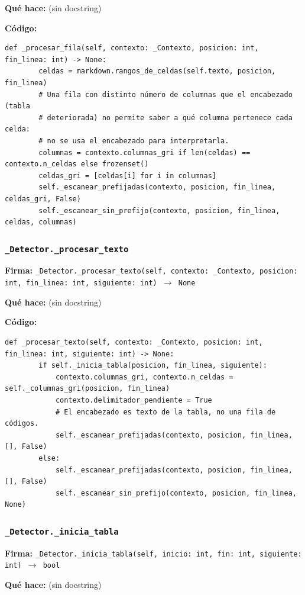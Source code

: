 \documentclass[11pt,a4paper]{article}
\begin{document}
\textbf{Qué hace:} (sin docstring)

\textbf{Código:}
\begin{lstlisting}
def _procesar_fila(self, contexto: _Contexto, posicion: int, fin_linea: int) -> None:
        celdas = markdown.rangos_de_celdas(self.texto, posicion, fin_linea)
        # Una fila con distinto número de columnas que el encabezado (tabla
        # deteriorada) no permite saber a qué columna pertenece cada celda:
        # no se usa el encabezado para interpretarla.
        columnas = contexto.columnas_gri if len(celdas) == contexto.n_celdas else frozenset()
        celdas_gri = [celdas[i] for i in columnas]
        self._escanear_prefijadas(contexto, posicion, fin_linea, celdas_gri, False)
        self._escanear_sin_prefijo(contexto, posicion, fin_linea, celdas, columnas)
\end{lstlisting}

\subsubsection*{\texttt{\_Detector.\_procesar\_texto}}
\textbf{Firma:} \texttt{\_Detector.\_procesar\_texto(self, contexto: \_Contexto, posicion: int, fin\_linea: int, siguiente: int) $\rightarrow$ None}

\textbf{Qué hace:} (sin docstring)

\textbf{Código:}
\begin{lstlisting}
def _procesar_texto(self, contexto: _Contexto, posicion: int, fin_linea: int, siguiente: int) -> None:
        if self._inicia_tabla(posicion, fin_linea, siguiente):
            contexto.columnas_gri, contexto.n_celdas = self._columnas_gri(posicion, fin_linea)
            contexto.delimitador_pendiente = True
            # El encabezado es texto de la tabla, no una fila de códigos.
            self._escanear_prefijadas(contexto, posicion, fin_linea, [], False)
        else:
            self._escanear_prefijadas(contexto, posicion, fin_linea, [], False)
            self._escanear_sin_prefijo(contexto, posicion, fin_linea, None)
\end{lstlisting}

\subsubsection*{\texttt{\_Detector.\_inicia\_tabla}}
\textbf{Firma:} \texttt{\_Detector.\_inicia\_tabla(self, inicio: int, fin: int, siguiente: int) $\rightarrow$ bool}

\textbf{Qué hace:} (sin docstring)
\end{document}
